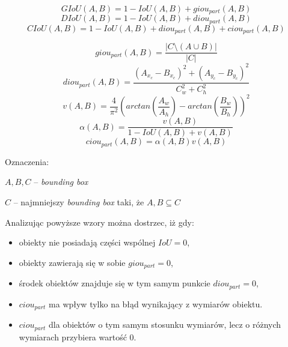 \begin{equation}
GIoU(A,B) = 1 - IoU(A,B) + giou_{part}(A,B)
\label{eq:giou}
\end{equation}
\begin{equation}
DIoU(A,B) = 1 - IoU(A,B) + diou_{part}(A,B)
\label{eq:diou}
\end{equation}
\begin{equation}
CIoU(A,B) = 1 - IoU(A,B) + diou_{part}(A,B) + ciou_{part}(A,B)
\label{eq:ciou}
\end{equation}

\begin{equation}
giou_{part}(A,B) = \frac{|C \setminus (A \cup B)|}{|C|}
\label{eq:giou_part}
\end{equation}
\begin{equation}
diou_{part}(A,B) = \frac{(A_{x_c} - B_{x_c})^2 + (A_{y_c} - B_{y_c})^2}{C_w^2+C_h^2}
\label{eq:diou_part}
\end{equation}
\begin{equation}
v(A,B) = \frac{4}{\pi^2} (arctan(\frac{A_w}{A_h}) - arctan(\frac{B_w}{B_h}))^2
\label{eq:ciou_v}
\end{equation}
\begin{equation}
\alpha(A,B) = \frac{v(A,B)}{1 - IoU(A,B) + v(A,B)}
\label{eq:ciou_alpha}
\end{equation}
\begin{equation}
ciou_{part}(A,B) = \alpha(A,B) v(A,B)
\label{eq:ciou_part}
\end{equation}


Oznaczenia:
\begin{description}
\item $A, B, C$ -- \emph{bounding box}
\item $C$ -- najmniejszy \emph{bounding box} taki, że $A,B \subseteq C$
\end{description}

Analizując powyższe wzory można dostrzec, iż gdy:
\begin{itemize}
\item obiekty nie posiadają  części wspólnej $IoU = 0$,
\item obiekty zawierają się w sobie $giou_{part} = 0$,
\item środek obiektów znajduje się w tym samym punkcie $diou_{part} = 0$,  
\item $ciou_{part}$ ma wpływ tylko na błąd wynikający z wymiarów obiektu. 
\item $ciou_{part}$ dla obiektów o tym samym stosunku wymiarów, lecz o różnych wymiarach przybiera wartość $0$. 
\end{itemize}

